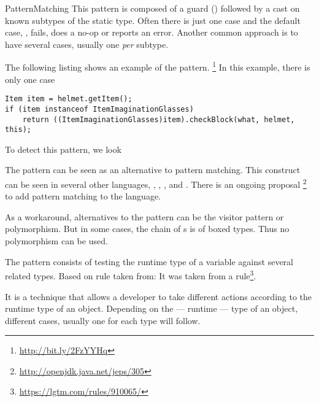 
\begin{pattern}{PatternMatching}
This pattern is composed of a guard () followed by a
cast on known subtypes of the static type.
Often there is just one case and the default case, \ie,
 fails, does a no-op or reports an error.
Another common approach is to have several cases,
usually one \emph{per} subtype.

\instances{}
The following listing shows an example of the \thisp{} pattern.%
\footnote{\url{http://bit.ly/2FzYYHq}}
In this example, there is only one case

\begin{verbatim}
Item item = helmet.getItem();
if (item instanceof ItemImaginationGlasses)
	return ((ItemImaginationGlasses)item).checkBlock(what, helmet, this);
\end{verbatim}

\detection{}
To detect this pattern, we look

\discussion{}
The \thisp{} pattern can be seen as an \adhoc{}
alternative to pattern matching.
This construct can be seen in several other languages, \eg,
\haskell{}, \scala{}, and \cs{}.
There is an ongoing proposal%
\footnote{\url{http://openjdk.java.net/jeps/305}} to add pattern
matching to the \java{} language.

As a workaround, alternatives to the \thisp{} pattern can be the
visitor pattern or polymorphism.
But in some cases, the chain of s is of boxed types.
Thus no polymorphism can be used.


The \thisp{} pattern consists of testing the runtime type of a variable against several related types.
Based on rule taken from:
It was taken from a \lgtm{} rule\footnote{\url{https://lgtm.com/rules/910065/}}.

It is a technique that allows a developer to take different actions according to the runtime type of an object.
Depending on the --- runtime --- type of an object, different cases, usually one for each type will follow.

\end{pattern}
